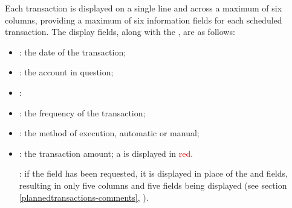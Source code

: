 Each transaction is displayed on a single line and across a maximum of six columns, providing a maximum of six information fields for each scheduled transaction. The display fields, along with the , are as follows:
\begin{itemize}
	\item {}: the date of the transaction;
	\item {}: the account in question;
	\item {}: 
	\item {}: the frequency of the transaction;
	\item {}: the method of execution, automatic or manual;
	\item {}: the transaction amount; a  is displayed in \textcolor{red}{red}.
	
	\Note{}: if the  field has been requested, it is displayed in place of the  and  fields, resulting in only five columns and five fields being displayed (see section \vref{plannedtransactions-comments}, ).
\end{itemize}


